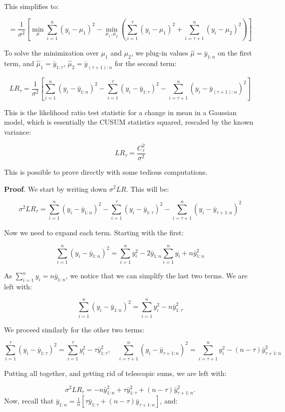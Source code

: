\documentclass[
  letterpaper,
  DIV=11,
  numbers=noendperiod]{scrreprt}
\begin{document}
This simplifies to:

\[
= \frac{1}{\sigma^2} \left[ \min_{\mu} \sum_{i=1}^n (y_i - \mu_1)^2 - \min_{\mu_1, \mu_2} \left( \sum_{i=1}^\tau (y_i - \mu_1)^2 + \sum_{i=\tau+1}^n (y_i - \mu_2)^2 \right) \right]
\]

To solve the minimization over \(\mu_1\) and \(\mu_2\), we plug-in
values \(\hat\mu = \bar{y}_{1:n}\) on the first term, and
\(\hat\mu_1 = \bar{y}_{1:\tau}\), \(\hat\mu_2 = \bar{y}_{(\tau+1):n}\)
for the second term:

\[
LR_\tau = \frac{1}{\sigma^2} \left[ \sum_{i=1}^n (y_i - \bar{y}_{1:n})^2 - \sum_{i=1}^\tau (y_i - \bar{y}_{1:\tau})^2 - \sum_{i=\tau+1}^n (y_i - \bar{y}_{(\tau+1):n})^2 \right]
\]

This is the likelihood ratio test statistic for a change in mean in a
Gaussian model, which is essentially the CUSUM statistics squared,
rescaled by the known variance:

\[
LR_\tau = \frac{C_\tau^2}{\sigma^2}
\]

This is possible to prove directly with some tedious computations.

\textbf{Proof}. We start by writing down \(\sigma^2 LR\). This will be:

\[
\sigma^2 LR_\tau = \sum_{i=1}^{n} (y_i - \bar{y}_{1:n})^2 - \sum_{i=1}^{\tau} (y_i - \bar{y}_{1:\tau})^2 - \sum_{i=\tau+1}^{n} (y_i - \bar{y}_{\tau+1:n})^2
\]

Now we need to expand each term. Starting with the first:

\[
\sum_{i=1}^{n} (y_i - \bar{y}_{1:n})^2 = \sum_{i=1}^{n} y_i^2  - 2 \bar{y}_{1:n} \sum_{i=1}^{n} y_i + n \bar{y}_{1:n}^2 
\]

As \(\sum_{i=1}^{n} y_i = n \bar{y}_{1:n}\), we notice that we can
simplify the last two terms. We are left with:

\[
\sum_{i=1}^{n} (y_i - \bar{y}_{1:n})^2 = \sum_{i=1}^{n} y_i^2 - n \bar{y}_{1:\tau}^2
\]

We proceed similarly for the other two terms:

\[
\sum_{i=1}^{\tau} (y_i - \bar{y}_{1:\tau})^2 = \sum_{i=1}^{\tau} y_i^2 - \tau \bar{y}_{1:\tau}^2, \quad \sum_{i=\tau + 1}^{n} (y_i - \bar{y}_{\tau+1:n})^2 = \sum_{i=\tau+1}^{n} y_i^2 - (n-\tau) \bar{y}_{\tau+1:n}^2
\]

Putting all together, and getting rid of telescopic sums, we are left
with:

\[
\sigma^2 LR_\tau = - n \bar{y}_{1:n}^2 + \tau \bar{y}_{1:\tau}^2 + (n - \tau) \bar{y}_{\tau+1:n}^2.
\] Now, recall that
\(\bar{y}_{1:n} = \frac{1}{n} \left[ \tau \bar{y}_{1:\tau} + (n - \tau) \bar{y}_{\tau+1:n} \right]\),
and:
\end{document}
